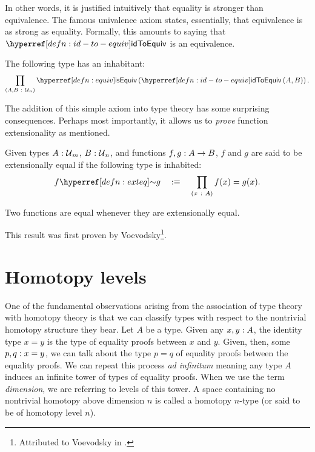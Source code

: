 In other words, it is justified intuitively that equality is stronger than equivalence.
The famous univalence axiom states, essentially, that equivalence is as strong as
equality. Formally, this amounts to saying that $\idtoeqvnm{}$ is an equivalence.

\begin{ax}[Univalence]\label{ax:ua}
  The following type has an inhabitant:
  \begin{equation*}
    \pity{A, B}{\univ{}_n}{\isequiv{\idtoeqv{A}{B}}}.
  \end{equation*}
\end{ax}

The addition of this simple axiom into type theory has some surprising consequences.
Perhaps most importantly, it allows us to \emph{prove} function extensionality as
mentioned.
\begin{defn}\label{defn:exteq}
  Given types $A\hspace{0.1mm}:\hspace{0.1mm}\mathcal{U}{}_m$, $B\hspace{0.1mm}:\hspace{0.1mm}\mathcal{U}{}_n$, and functions
  $f, g:A \rightarrow B$, $f$ and $g$ are said to be extensionally equal if the following
  type is inhabited:
  \begin{equation*}
    \exteq{f}{g} \quad\is\quad \pity{x}{A}{f(x) = g(x)}.
  \end{equation*}
\end{defn}

\begin{prop}\label{prop:funext}
  Two functions are equal whenever they are extensionally equal.
\end{prop}

This result was first proven by Voevodsky\footnote{%
  Attributed to Voevodsky in \cite{escardo-uf-intro}.
}.

\section{Homotopy levels}

One of the fundamental observations arising from the association of type theory with
homotopy theory is that we can classify types with respect to the nontrivial homotopy
structure they bear. Let $A$ be a type. Given any $x, y:A$, the identity type $x
= y$ is the type of equality proofs between $x$ and $y$. Given, then, some
$p, q:x = y$, we can talk about the type $p = q$ of equality proofs between the
equality proofs. We can repeat this process \emph{ad infinitum} meaning any type $A$
induces an infinite tower of types of equality proofs. When we use the term
\emph{dimension}, we are referring to levels of this tower. A space containing no
nontrivial homotopy above dimension $n$ is called a homotopy $n$-type (or said to be of
homotopy level $n$).

